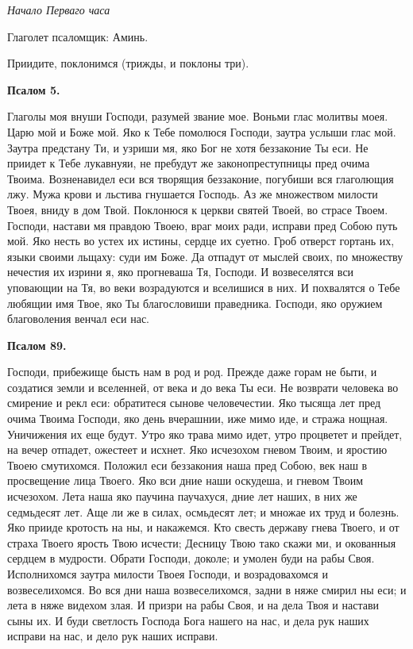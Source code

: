 \itshape Начало Перваго часа 


Глаголет псаломщик:\normalfont{} Аминь.

Приидите, поклонимся (трижды, и поклоны три).


\medskip


\bfseries Псалом 5.\normalfont{}


Глаголы моя внуши Господи, разумей звание мое. Воньми глас молитвы моея. Царю мой и Боже мой. Яко к Тебе помолюся Господи, заутра услыши глас мой. Заутра предстану Ти, и узриши мя, яко Бог не хотя беззаконие Ты еси. Не приидет к Тебе лукавнуяи, не пребудут же законопреступницы пред очима Твоима. Возненавидел еси вся творящия беззаконие, погубиши вся глаголющия лжу. Мужа крови и льстива гнушается Господь. Аз же множеством милости Твоея, вниду в дом Твой. Поклонюся к церкви святей Твоей, во страсе Твоем. Господи, настави мя правдою Твоею, враг моих ради, исправи пред Собою путь мой. Яко несть во устех их истины, сердце их суетно. Гроб отверст гортань их, языки своими льщаху: суди им Боже. Да отпадут от мыслей своих, по множеству нечестия их изрини я, яко прогневаша Тя, Господи. И возвеселятся вси уповающии на Тя, во веки возрадуются и вселишися в них. И похвалятся о Тебе любящии имя Твое, яко Ты благословиши праведника. Господи, яко оружием благоволения венчал еси нас.


\medskip


\bfseries Псалом 89.\normalfont{}


Господи, прибежище бысть нам в род и род. Прежде даже горам не быти, и создатися земли и вселенней, от века и до века Ты еси. Не возврати человека во смирение и рекл еси: обратитеся сынове человечестии. Яко тысяща лет пред очима Твоима Господи, яко день вчерашнии, иже мимо иде, и стража нощная. Уничижения их еще будут. Утро яко трава мимо идет, утро процветет и прейдет, на вечер отпадет, ожестеет и исхнет. Яко исчезохом гневом Твоим, и яростию Твоею смутихомся. Положил еси беззакония наша пред Собою, век наш в просвещение лица Твоего. Яко вси дние наши оскудеша, и гневом Твоим исчезохом. Лета наша яко паучина паучахуся, дние лет наших, в них же седмьдесят лет. Аще ли же в силах, осмьдесят лет; и множае их труд и болезнь. Яко прииде кротость на ны, и накажемся. Кто свесть державу гнева Твоего, и от страха Твоего ярость Твою исчести; Десницу Твою тако скажи ми, и окованныя сердцем в мудрости. Обрати Господи, доколе; и умолен буди на рабы Своя. Исполнихомся заутра милости Твоея Господи, и возрадовахомся и возвеселихомся. Во вся дни наша возвеселихомся, задни в няже смирил ны еси; и лета в няже видехом злая. И призри на рабы Своя, и на дела Твоя и настави сыны их. И буди светлость Господа Бога нашего на нас, и дела рук наших исправи на нас, и дело рук наших исправи.


